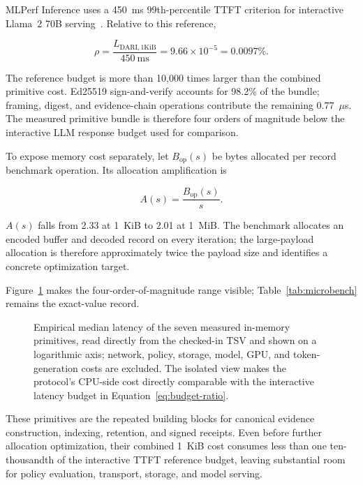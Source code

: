\documentclass[10pt]{article}
\begin{document}
MLPerf Inference uses a 450~ms 99th-percentile TTFT criterion for interactive Llama~2 70B serving~\cite{mlperf2025llm}. Relative to this reference,

\begin{equation}
\rho = \frac{L_{\mathrm{DARI},1\mathrm{KiB}}}{450~\mathrm{ms}}
= 9.66 \times 10^{-5} = 0.0097\%.
\label{eq:budget-ratio}
\end{equation}

The reference budget is more than 10,000 times larger than the combined primitive cost. Ed25519 sign-and-verify accounts for 98.2\% of the bundle; framing, digest, and evidence-chain operations contribute the remaining 0.77~$\mu$s. The measured primitive bundle is therefore four orders of magnitude below the interactive LLM response budget used for comparison.

To expose memory cost separately, let $B_{\mathrm{op}}(s)$ be bytes allocated per record benchmark operation. Its allocation amplification is

\begin{equation}
A(s) = \frac{B_{\mathrm{op}}(s)}{s}.
\label{eq:allocation}
\end{equation}

$A(s)$ falls from 2.33 at 1~KiB to 2.01 at 1~MiB. The benchmark allocates an encoded buffer and decoded record on every iteration; the large-payload allocation is therefore approximately twice the payload size and identifies a concrete optimization target.

Figure~\ref{fig:primitive-latency} makes the four-order-of-magnitude range visible; Table~\ref{tab:microbench} remains the exact-value record.

\begin{figure}[H]
  \centering
  
  \caption{Empirical median latency of the seven measured in-memory primitives, read directly from the checked-in TSV and shown on a logarithmic axis; network, policy, storage, model, GPU, and token-generation costs are excluded. The isolated view makes the protocol's CPU-side cost directly comparable with the interactive latency budget in Equation~\ref{eq:budget-ratio}.}
  \label{fig:primitive-latency}
\end{figure}

These primitives are the repeated building blocks for canonical evidence construction, indexing, retention, and signed receipts. Even before further allocation optimization, their combined 1~KiB cost consumes less than one ten-thousandth of the interactive TTFT reference budget, leaving substantial room for policy evaluation, transport, storage, and model serving.
\end{document}
